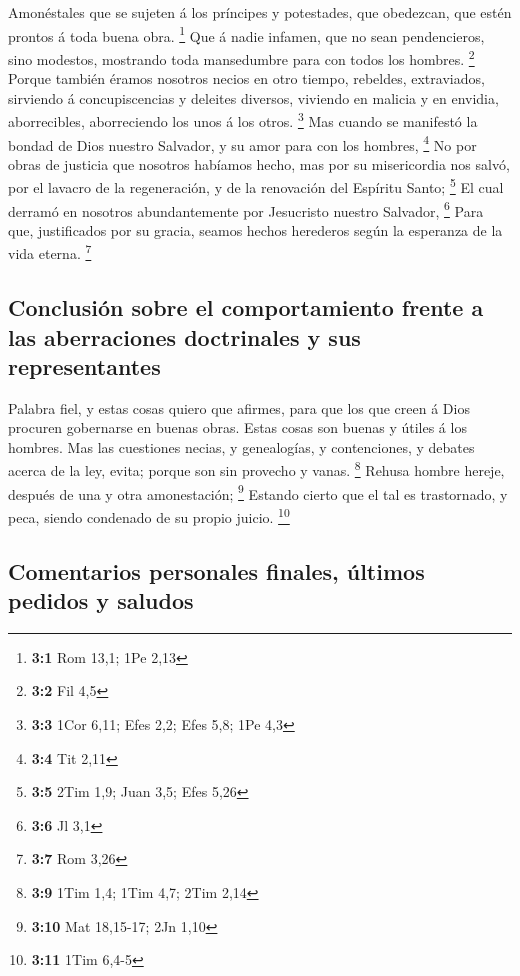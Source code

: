  Amonéstales que se sujeten á los príncipes y potestades,
que obedezcan, que estén prontos á toda buena obra. \footnote{\textbf{3:1}
  Rom 13,1; 1Pe 2,13}  Que á nadie infamen, que no sean
pendencieros, sino modestos, mostrando toda mansedumbre para con todos
los hombres. \footnote{\textbf{3:2} Fil 4,5}  Porque
también éramos nosotros necios en otro tiempo, rebeldes, extraviados,
sirviendo á concupiscencias y deleites diversos, viviendo en malicia y
en envidia, aborrecibles, aborreciendo los unos á los otros. \footnote{\textbf{3:3}
  1Cor 6,11; Efes 2,2; Efes 5,8; 1Pe 4,3}  Mas cuando se
manifestó la bondad de Dios nuestro Salvador, y su amor para con los
hombres, \footnote{\textbf{3:4} Tit 2,11}  No por obras de
justicia que nosotros habíamos hecho, mas por su misericordia nos salvó,
por el lavacro de la regeneración, y de la renovación del Espíritu
Santo; \footnote{\textbf{3:5} 2Tim 1,9; Juan 3,5; Efes 5,26}
 El cual derramó en nosotros abundantemente por Jesucristo
nuestro Salvador, \footnote{\textbf{3:6} Jl 3,1}  Para
que, justificados por su gracia, seamos hechos herederos según la
esperanza de la vida eterna. \footnote{\textbf{3:7} Rom 3,26}

\hypertarget{conclusiuxf3n-sobre-el-comportamiento-frente-a-las-aberraciones-doctrinales-y-sus-representantes}{%
\subsection{Conclusión sobre el comportamiento frente a las aberraciones
doctrinales y sus
representantes}\label{conclusiuxf3n-sobre-el-comportamiento-frente-a-las-aberraciones-doctrinales-y-sus-representantes}}

 Palabra fiel, y estas cosas quiero que afirmes, para que
los que creen á Dios procuren gobernarse en buenas obras. Estas cosas
son buenas y útiles á los hombres.  Mas las cuestiones
necias, y genealogías, y contenciones, y debates acerca de la ley,
evita; porque son sin provecho y vanas. \footnote{\textbf{3:9} 1Tim 1,4;
  1Tim 4,7; 2Tim 2,14}  Rehusa hombre hereje, después de
una y otra amonestación; \footnote{\textbf{3:10} Mat 18,15-17; 2Jn 1,10}
 Estando cierto que el tal es trastornado, y peca, siendo
condenado de su propio juicio. \footnote{\textbf{3:11} 1Tim 6,4-5}

\hypertarget{comentarios-personales-finales-uxfaltimos-pedidos-y-saludos}{%
\subsection{Comentarios personales finales, últimos pedidos y
saludos}\label{comentarios-personales-finales-uxfaltimos-pedidos-y-saludos}}

